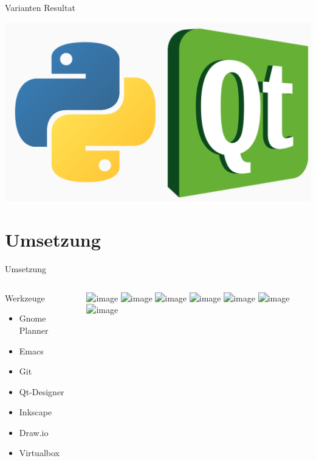 \documentclass[aspectratio=1610]{beamer}
\begin{document}
\begin{frame}[label={sec:org9f11d8c}]{Varianten}
\alert{Resultat}

\begin{center}
\includegraphics[height=.5\textheight]{pictures/pyqt.png}
\end{center}
\end{frame}

\section{Umsetzung}
\label{sec:orgb08d7e9}
\begin{frame}[label={sec:orgaf9cafa}]{Umsetzung}
\begin{columns}
\begin{column}{0.3\columnwidth}
\alert{Werkzeuge}

\begin{itemize}
\item <2-> Gnome Planner
\item <3-> Emacs
\item <4-> Git
\item <5-> Qt-Designer
\item <6-> Inkscape
\item <7-> Draw.io
\item <8-> Virtualbox
\end{itemize}
\end{column}

\begin{column}{0.5\columnwidth}
\begin{center}
\includegraphics<2>[width=.9\linewidth]{pictures/tools1.png}%
\includegraphics<3>[width=.9\linewidth]{pictures/tools2.png}%
\includegraphics<4>[width=.9\linewidth]{pictures/tools3.png}%
\includegraphics<5>[width=.9\linewidth]{pictures/tools3.png}%
\includegraphics<6>[width=.9\linewidth]{pictures/tools5.png}%
\includegraphics<7>[width=.9\linewidth]{pictures/tools6.png}%
\includegraphics<8>[width=.9\linewidth]{pictures/tools7.png}%
\end{center}
\end{column}
\end{columns}
\end{frame}
\end{document}
